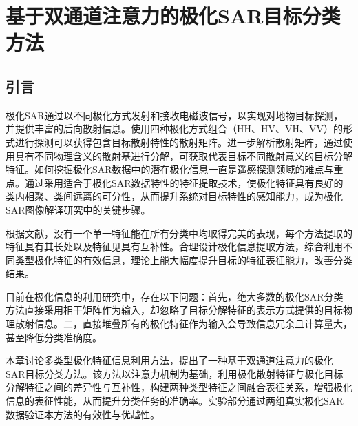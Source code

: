\chapter{基于双通道注意力的极化SAR目标分类方法}
\section{引言}
极化SAR通过以不同极化方式发射和接收电磁波信号，以实现对地物目标探测，并提供丰富的后向散射信息。使用四种极化方式组合（HH、HV、VH、VV）的形式进行探测可以获得包含目标散射特性的散射矩阵。进一步解析散射矩阵，通过使用具有不同物理含义的散射基进行分解，可获取代表目标不同散射意义的目标分解特征。如何挖掘极化SAR数据中的潜在极化信息一直是遥感探测领域的难点与重点。通过采用适合于极化SAR数据特性的特征提取技术，使极化特征具有良好的类内相聚、类间远离的可分性，从而提升系统对目标特性的感知能力，成为极化SAR图像解译研究中的关键步骤。

根据文献\cite{刘高峰2014极化,1017062722.nh}，没有一个单一特征能在所有分类中均取得完美的表现，每个方法提取的特征具有其长处以及特征见具有互补性。合理设计极化信息提取方法，综合利用不同类型极化特征的有效信息，理论上能大幅度提升目标的特征表征能力，改善分类结果。


目前在极化信息的利用研究中，存在以下问题：首先，绝大多数的极化SAR分类方法直接采用相干矩阵作为输入，却忽略了目标分解特征的表示方式提供的目标物理散射信息。二，直接堆叠所有的极化特征作为输入会导致信息冗余且计算量大，甚至降低分类准确度。

本章讨论多类型极化特征信息利用方法，提出了一种基于双通道注意力的极化SAR目标分类方法。该方法以注意力机制为基础，利用极化散射特征与极化目标分解特征之间的差异性与互补性，构建两种类型特征之间融合表征关系，增强极化信息的表征性能，从而提升分类任务的准确率。实验部分通过两组真实极化SAR数据验证本方法的有效性与优越性。



